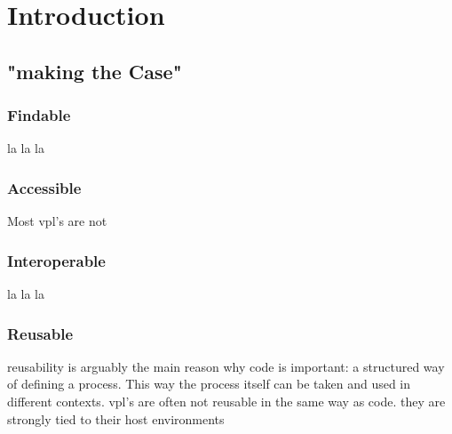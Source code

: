 
\section{Introduction}




\subsection{"making the Case"}

\subsubsection{Findable}
la la la 

\subsubsection{Accessible}
Most vpl's are not 


\subsubsection{Interoperable}
la la la 

\subsubsection{Reusable}
reusability is arguably the main reason why code is important: a structured way of defining a process. 
This way the process itself can be taken and used in different contexts.
vpl's are often not reusable in the same way as code. they are strongly tied to their host environments

